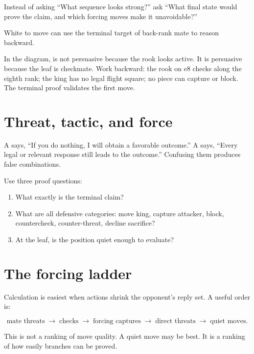 Instead of asking ``What sequence looks strong?'' ask ``What final state would prove the claim, and which forcing moves make it unavoidable?''

\begin{positiondiagram}{White to move can use the terminal target of back-rank mate to reason backward.}
\end{positiondiagram}

In the diagram,  is not persuasive because the rook looks active. It is persuasive because the leaf is checkmate. Work backward: the rook on e8 checks along the eighth rank; the king has no legal flight square; no piece can capture or block. The terminal proof validates the first move.

\section{Threat, tactic, and force}
A  says, ``If you do nothing, I will obtain a favorable outcome.'' A  says, ``Every legal or relevant response still leads to the outcome.'' Confusing them produces false combinations.

Use three proof questions:

\begin{enumerate}[label=\textbf{\arabic*.},leftmargin=2em]
\item What exactly is the terminal claim?
\item What are all defensive categories: move king, capture attacker, block, countercheck, counter-threat, decline sacrifice?
\item At the leaf, is the position quiet enough to evaluate?
\end{enumerate}

\section{The forcing ladder}
Calculation is easiest when actions shrink the opponent's reply set. A useful order is:

\[
\text{mate threats} \;\rightarrow\; \text{checks} \;\rightarrow\; \text{forcing captures} \;\rightarrow\; \text{direct threats} \;\rightarrow\; \text{quiet moves}.
\]

This is not a ranking of move quality. A quiet move may be best. It is a ranking of how easily branches can be proved.

